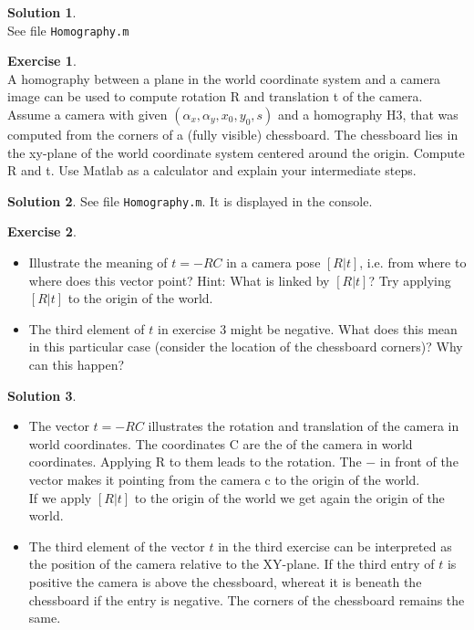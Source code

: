 \documentclass[11pt,english,paper=a4]{scrartcl}
\theoremstyle{definition} %
\newtheorem{Exercise}{Exercise}
\newtheorem*{Solution}{Solution}
\begin{document}
\begin{Solution}\ \\
	See file \verb|Homography.m|
\end{Solution}

\begin{Exercise}\ \\
	A homography between a plane in the world coordinate system and a camera image can be used to
	compute rotation R and translation t of the camera. Assume a camera with given $(\alpha_x, \alpha_y, x_0, y_0, s)$ and
	a homography H3, that was computed from the corners of a (fully visible) chessboard. The chessboard
	lies in the xy-plane of the world coordinate system centered around the origin. Compute R and t. Use
	Matlab as a calculator and explain your intermediate steps.
\end{Exercise}

\begin{Solution}
	See file \verb|Homography.m|. It is displayed in the console.
\end{Solution}

\begin{Exercise}\ \\
	\begin{itemize}
		\item [1.] Illustrate the meaning of $t = -RC$ in a camera pose $[R|t]$, i.e. from where to where does this vector point? Hint: What is linked by $[R|t]$? Try applying $[R|t]$ to the origin of the world. \\
		\item [2.] The third element of $t$ in exercise 3 might be negative. What does this mean in this particular case (consider the location of the chessboard corners)? Why can this happen?
	\end{itemize}
\end{Exercise}

\begin{Solution}
	\begin{itemize}
		\item [1.]	The vector $t = -RC$ illustrates the rotation and translation of the camera in world coordinates. The coordinates C are the of the camera in world coordinates. Applying R to them leads to the rotation. The $-$ in front of the vector makes it pointing from the camera c to the origin of the world. \\
		If we apply $[R|t]$ to the origin of the world we get again the origin of the world. \\
		\item[2.] The third element of the vector $t$ in the third exercise can be interpreted as the position of the camera relative to the XY-plane. If the third entry of $t$ is positive the camera is above the chessboard, whereat it is beneath the chessboard if the entry is negative. The corners of the chessboard remains the same.
	\end{itemize}

\end{Solution}
\end{document}
